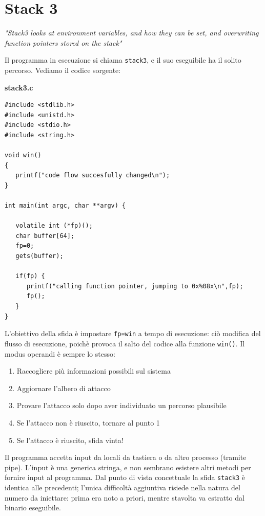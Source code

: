 \section{Stack 3}
\begin{center}
    \textit{"Stack3 looks at environment variables, and
how they can be set, and overwriting function
pointers stored on the stack"}
\end{center}
Il programma in esecuzione si chiama \texttt{stack3}, e il suo eseguibile ha il solito percorso. Vediamo il codice sorgente:
\begin{mdframed}[backgroundcolor=white!20,shadow=false]
\textbf{stack3.c}
\begin{verbatim}
#include <stdlib.h>
#include <unistd.h>
#include <stdio.h>
#include <string.h>

void win()
{
   printf("code flow succesfully changed\n");
}

int main(int argc, char **argv) {

   volatile int (*fp)();
   char buffer[64];
   fp=0;
   gets(buffer);
   
   if(fp) {
      printf("calling function pointer, jumping to 0x%08x\n",fp);
      fp();
   }
} 
\end{verbatim}
\end{mdframed}
L'obiettivo della sfida è impostare \texttt{fp=win} a
tempo di esecuzione: ciò modifica del flusso di esecuzione,
poichè provoca il salto del codice
alla funzione \texttt{win()}. Il modus operandi è sempre lo stesso:
\begin{enumerate}
    \item Raccogliere più informazioni possibili sul sistema
    \item Aggiornare l'albero di attacco
    \item Provare l'attacco solo dopo aver individuato un
percorso plausibile
    \item Se l'attacco non è riuscito, tornare al punto 1
    \item Se l'attacco è riuscito, sfida vinta! 
\end{enumerate} 
Il programma accetta input da locali da tastiera o da altro processo (tramite pipe). L'input è una generica stringa, e non sembrano esistere altri metodi per fornire input al programma. Dal punto di vista concettuale la sfida \texttt{stack3} è identica alle precedenti; l'unica difficoltà aggiuntiva risiede nella natura del numero da iniettare: prima era noto a priori, mentre stavolta va estratto dal binario eseguibile. 


